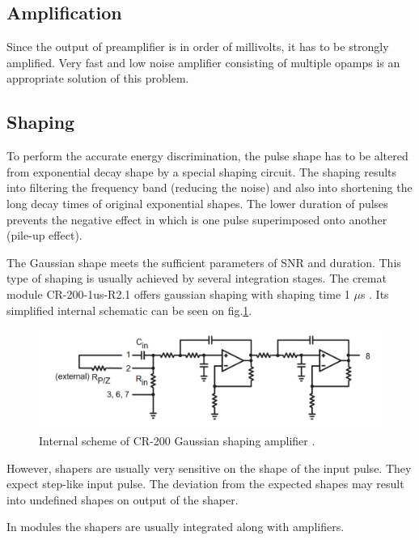 \par



\subsection{Amplification}
Since the output of preamplifier is in order of millivolts, it has to be strongly amplified. Very fast and low noise amplifier consisting of multiple opamps is an appropriate solution of this problem.



\subsection{Shaping}

To perform the accurate energy discrimination, the pulse shape has to be altered from exponential decay shape by a special shaping circuit. The shaping results into filtering the frequency band (reducing the noise) and also into shortening the long decay times of original exponential shapes. The lower duration of pulses prevents the negative effect in which is one pulse superimposed onto another (pile-up effect).

\par
The Gaussian shape meets the sufficient parameters of SNR and duration. This type of shaping is usually achieved by several integration stages. The cremat module CR-200-1us-R2.1 offers gaussian shaping with shaping time 1 $\mu$s \cite{cr200}. Its simplified internal schematic can be seen on fig.\ref{internal2}. 


\begin{figure}[H]
 \centering
 \includegraphics[scale=0.35, angle = 0]{./pictures/CRshaper.png}
 \caption{Internal scheme of CR-200 Gaussian shaping amplifier \cite{cr200}.}
 \label{internal2}
 
\end{figure}

However, shapers are usually very sensitive on the shape of the input pulse. They expect step-like input pulse. The deviation from the expected shapes may result into undefined shapes on output of the shaper.
\par
In modules the shapers are usually integrated along with amplifiers.

